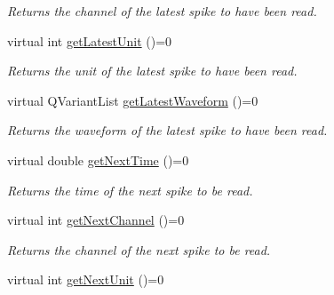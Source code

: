 \begin{DoxyCompactItemize}
\begin{DoxyCompactList}\small\item\em Returns the channel of the latest spike to have been read. \end{DoxyCompactList}\item 
\hypertarget{class_picto_1_1_spike_reader_a1a15c9485e869bb0598fd48c108cdbb1}{virtual int \hyperlink{class_picto_1_1_spike_reader_a1a15c9485e869bb0598fd48c108cdbb1}{get\-Latest\-Unit} ()=0}\label{class_picto_1_1_spike_reader_a1a15c9485e869bb0598fd48c108cdbb1}

\begin{DoxyCompactList}\small\item\em Returns the unit of the latest spike to have been read. \end{DoxyCompactList}\item 
\hypertarget{class_picto_1_1_spike_reader_ae800bc2be3ff6ff61aef6099641d2abf}{virtual Q\-Variant\-List \hyperlink{class_picto_1_1_spike_reader_ae800bc2be3ff6ff61aef6099641d2abf}{get\-Latest\-Waveform} ()=0}\label{class_picto_1_1_spike_reader_ae800bc2be3ff6ff61aef6099641d2abf}

\begin{DoxyCompactList}\small\item\em Returns the waveform of the latest spike to have been read. \end{DoxyCompactList}\item 
\hypertarget{class_picto_1_1_spike_reader_af6eccc81e593d48535ba7e5281fcff0c}{virtual double \hyperlink{class_picto_1_1_spike_reader_af6eccc81e593d48535ba7e5281fcff0c}{get\-Next\-Time} ()=0}\label{class_picto_1_1_spike_reader_af6eccc81e593d48535ba7e5281fcff0c}

\begin{DoxyCompactList}\small\item\em Returns the time of the next spike to be read. \end{DoxyCompactList}\item 
\hypertarget{class_picto_1_1_spike_reader_a983c9c5a2e96e3480afe66ab6d690339}{virtual int \hyperlink{class_picto_1_1_spike_reader_a983c9c5a2e96e3480afe66ab6d690339}{get\-Next\-Channel} ()=0}\label{class_picto_1_1_spike_reader_a983c9c5a2e96e3480afe66ab6d690339}

\begin{DoxyCompactList}\small\item\em Returns the channel of the next spike to be read. \end{DoxyCompactList}\item 
\hypertarget{class_picto_1_1_spike_reader_a36421ac4fae5933545628e5a753863b6}{virtual int \hyperlink{class_picto_1_1_spike_reader_a36421ac4fae5933545628e5a753863b6}{get\-Next\-Unit} ()=0}\label{class_picto_1_1_spike_reader_a36421ac4fae5933545628e5a753863b6}


\end{DoxyCompactItemize}
